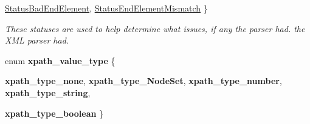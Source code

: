 \begin{DoxyCompactItemize}
\hyperlink{namespacephys_1_1xml_ae7aabb879b21c73d8183a54470f8917fa72532447020c081f343c4a719add7450}{StatusBadEndElement}, 
\hyperlink{namespacephys_1_1xml_ae7aabb879b21c73d8183a54470f8917fa6b8d817142e0898ad9b1c61cfa54b8ea}{StatusEndElementMismatch}
 \}
\begin{DoxyCompactList}\small\item\em These statuses are used to help determine what issues, if any the parser had. the XML parser had. \item\end{DoxyCompactList}\item 
enum {\bfseries xpath\_\-value\_\-type} \{ \par
{\bfseries xpath\_\-type\_\-none}, 
{\bfseries xpath\_\-type\_\-NodeSet}, 
{\bfseries xpath\_\-type\_\-number}, 
{\bfseries xpath\_\-type\_\-string}, 
\par
{\bfseries xpath\_\-type\_\-boolean}
 \}
\end{DoxyCompactItemize}
